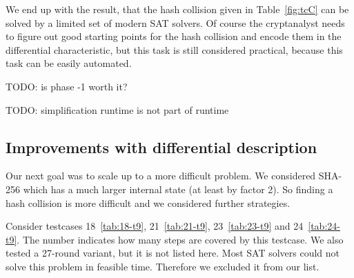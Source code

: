 We end up with the result, that the hash collision given in Table~\ref{fig:tcC}
can be solved by a limited set of modern SAT solvers. Of course the cryptanalyst
needs to figure out good starting points for the hash collision and encode them
in the differential characteristic, but this task is still considered practical,
because this task can be easily automated.

TODO: is phase -1 worth it?

TODO: simplification runtime is not part of runtime

\subsection{Improvements with differential description}
\label{sec:result-diff-desc}
%
Our next goal was to scale up to a more difficult problem. We considered SHA-256
which has a much larger internal state (at least by factor 2). So finding a hash
collision is more difficult and we considered further strategies.

Consider testcases 18~\ref{tab:18-t9}, 21~\ref{tab:21-t9}, 23~\ref{tab:23-t9}
and 24~\ref{tab:24-t9}. The number indicates how many steps are covered by this
testcase. We also tested a 27-round variant, but it is not listed here.
Most SAT solvers could not solve this problem in feasible time. Therefore we
excluded it from our list.

